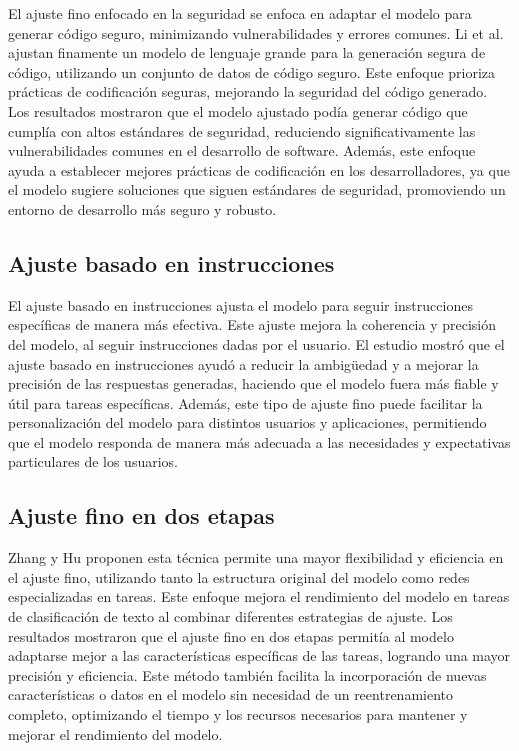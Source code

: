 El ajuste fino enfocado en la seguridad se enfoca en adaptar el modelo para generar código seguro, minimizando vulnerabilidades y errores comunes. Li et al. \cite{JLi2024}  ajustan finamente un modelo de lenguaje grande para la generación segura de código, utilizando un conjunto de datos de código seguro. Este enfoque prioriza prácticas de codificación seguras, mejorando la seguridad del código generado. Los resultados mostraron que el modelo ajustado podía generar código que cumplía con altos estándares de seguridad, reduciendo significativamente las vulnerabilidades comunes en el desarrollo de software. Además, este enfoque ayuda a establecer mejores prácticas de codificación en los desarrolladores, ya que el modelo sugiere soluciones que siguen estándares de seguridad, promoviendo un entorno de desarrollo más seguro y robusto.

\subsection{Ajuste basado en instrucciones}

El ajuste basado en instrucciones \cite{Liesenfeld2023} ajusta el modelo para seguir instrucciones específicas de manera más efectiva. Este ajuste mejora la coherencia y precisión del modelo, al seguir instrucciones dadas por el usuario. El estudio mostró que el ajuste basado en instrucciones ayudó a reducir la ambigüedad y a mejorar la precisión de las respuestas generadas, haciendo que el modelo fuera más fiable y útil para tareas específicas. Además, este tipo de ajuste fino puede facilitar la personalización del modelo para distintos usuarios y aplicaciones, permitiendo que el modelo responda de manera más adecuada a las necesidades y expectativas particulares de los usuarios.

\subsection{Ajuste fino en dos etapas}

 Zhang y Hu \cite{Zhang2021} proponen esta técnica permite una mayor flexibilidad y eficiencia en el ajuste fino, utilizando tanto la estructura original del modelo como redes especializadas en tareas. Este enfoque mejora el rendimiento del modelo en tareas de clasificación de texto al combinar diferentes estrategias de ajuste. Los resultados mostraron que el ajuste fino en dos etapas permitía al modelo adaptarse mejor a las características específicas de las tareas, logrando una mayor precisión y eficiencia. Este método también facilita la incorporación de nuevas características o datos en el modelo sin necesidad de un reentrenamiento completo, optimizando el tiempo y los recursos necesarios para mantener y mejorar el rendimiento del modelo.

